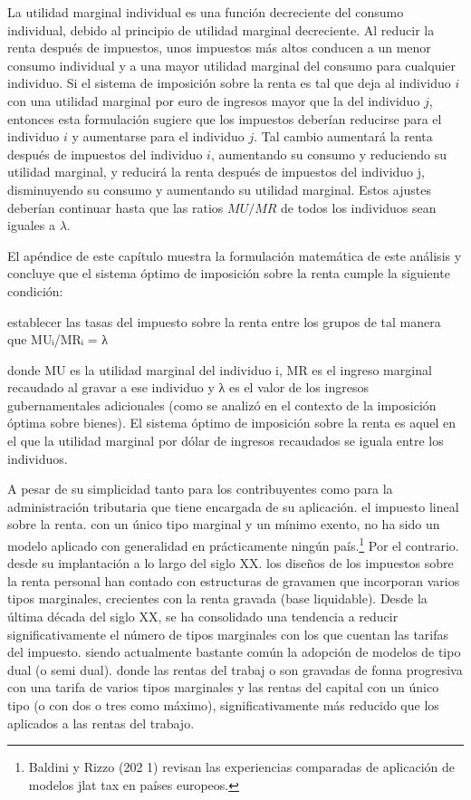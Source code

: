 \documentclass[10pt,a4paper]{article}
\begin{document}
La utilidad marginal individual es una función decreciente del consumo individual, debido al principio de utilidad marginal decreciente. Al reducir la renta después de impuestos, unos impuestos más altos conducen a un menor consumo individual y a una mayor utilidad marginal del consumo para cualquier individuo. Si el sistema de imposición sobre la renta es tal que deja al individuo $i$ con una utilidad marginal por euro de ingresos mayor que la del individuo $j$, entonces esta formulación sugiere que los impuestos deberían reducirse para el individuo $i$ y aumentarse para el individuo $j$. Tal cambio aumentará la renta después de impuestos del individuo $i$, aumentando su consumo y reduciendo su utilidad marginal, y reducirá la renta después de impuestos del individuo j, disminuyendo su consumo y aumentando su utilidad marginal. Estos ajustes deberían continuar hasta que las ratios $MU/MR$ de todos los individuos sean iguales a $\lambda$.

El apéndice de este capítulo muestra la formulación matemática de este análisis y concluye que el sistema óptimo de imposición sobre la renta cumple la siguiente condición:

establecer las tasas del impuesto sobre la renta entre los grupos de tal manera que MUᵢ/MRᵢ = λ

donde MU es la utilidad marginal del individuo i, MR es el ingreso marginal recaudado al gravar a ese individuo y λ es el valor de los ingresos gubernamentales adicionales (como se analizó en el contexto de la imposición óptima sobre bienes). El sistema óptimo de imposición sobre la renta es aquel en el que la utilidad marginal por dólar de ingresos recaudados se iguala entre los individuos.


A pesar de su simplicidad tanto para los contribuyentes como para la administración tributaria que tiene encargada de su aplicación. el impuesto lineal sobre la renta. con un único tipo marginal y un mínimo exento, no ha sido un modelo aplicado con generalidad en prácticamente ningún país.\footnote{%
    Baldini y Rizzo (202 1) revisan las experiencias comparadas de aplicación de modelos jlat tax en países
europeos.
} Por el contrario. desde su implantación a lo largo del siglo XX. los diseños de los impuestos sobre la renta personal han contado con estructuras de gravamen que incorporan varios tipos marginales, crecientes con la renta gravada (base liquidable). Desde la última década del siglo XX, se ha consolidado una tendencia a reducir significativamente el número de tipos marginales con los que cuentan las tarifas del impuesto. siendo actualmente bastante común la adopción de modelos de tipo dual (o semi dual). donde las rentas del trabaj o son gravadas de fonna progresiva con una tarifa de varios tipos marginales y las rentas del capital con un único tipo (o con dos o tres como máximo), significativamente más reducido que los aplicados a las rentas del trabajo.
\end{document}
